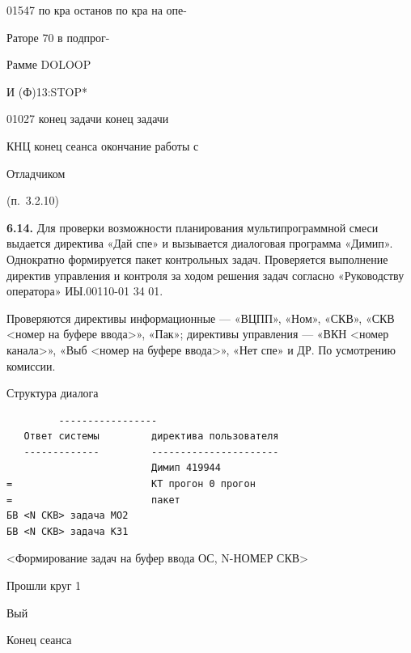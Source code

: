 \documentclass[11pt,a4paper]{article}
\begin{document}
\begin{center}01547 по кра останов по кра на опе-\end{center}
\begin{center}Раторе 70 в подпрог-\end{center}
\begin{center}Рамме DOLOOP\end{center}
И (Ф)13:STOP*

\begin{center}01027 конец задачи конец задачи\end{center}
КНЦ конец сеанса окончание работы с

\begin{center}Отладчиком\end{center}
\begin{center}(п.~3.2.10)\end{center}
\par\textbf{6.14.} Для проверки возможности планирования мультипрограммной смеси выдается директива «Дай спе» и вызывается диалоговая программа «Димип». Однократно формируется пакет контрольных задач. Проверяется выполнение директив управления и контроля за ходом решения задач согласно «Руководству оператора» ИЫ.00110-01 34 01.\par
Проверяются директивы информационные --- «ВЦПП», «Ном», «СКВ», «СКВ <номер на буфере ввода>», «Пак»; директивы управления --- «ВКН <номер канала>», «Выб <номер на буфере ввода>», «Нет спе» и ДР. По усмотрению комиссии.

\begin{center}Структура диалога\end{center}
\begin{center}\small
\begin{BVerbatim}
         -----------------
   Ответ системы         директива пользователя
   -------------         ----------------------
                         Димип 419944
=                        КТ прогон 0 прогон
=                        пакет
БВ <N СКВ> задача МО2
БВ <N СКВ> задача КЗ1
\end{BVerbatim}
\end{center}

<Формирование задач на буфер ввода ОС, N-НОМЕР СКВ>

Прошли круг 1

\begin{center}Вый\end{center}
Конец сеанса
\end{document}
